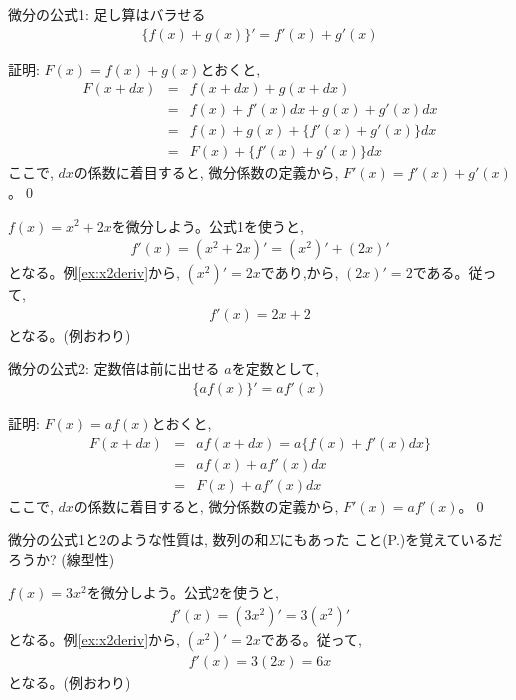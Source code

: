\begin{itembox}{微分の公式1: 足し算はバラせる}
\begin{eqnarray}
\{f(x)+g(x)\}'=f'(x)+g'(x)\label{eq:diff_form1}
\end{eqnarray}
\end{itembox}
証明: $F(x)=f(x)+g(x)$とおくと, 
\begin{eqnarray}
F(x+dx) & = & f(x+dx)+g(x+dx)\nonumber\\
               & = & f(x)+f'(x)dx+g(x)+g'(x)dx\nonumber\\
               & = & f(x)+g(x)+\{f'(x)+g'(x)\}dx\nonumber\\
               & = & F(x)+\{f'(x)+g'(x)\}dx
\end{eqnarray}
ここで, $dx$の係数に着目すると, 微分係数の定義から, $F'(x)=f'(x)+g'(x)$。\qed
\vv

\begin{exmpl}  $f(x)=x^2+2x$を微分しよう。公式1を使うと, 
\begin{eqnarray}
f'(x)=(x^2+2x)'=(x^2)'+(2x)'
\end{eqnarray}
となる。例\ref{ex:x2deriv}から, $(x^2)'=2x$であり,から, $(2x)'=2$である。従って, 
\begin{eqnarray}
f'(x)=2x+2
\end{eqnarray}
となる。(例おわり)\end{exmpl}
\hv

\begin{itembox}{微分の公式2: 定数倍は前に出せる}
$a$を定数として, 
\begin{eqnarray}
\{af(x)\}'=af'(x)\label{eq:diff_form2}
\end{eqnarray}
\end{itembox}
証明: $F(x)=af(x)$とおくと, 
\begin{eqnarray}
F(x+dx) & = & af(x+dx) = a\{f(x)+f'(x)dx\}\nonumber\\
               & = & af(x)+af'(x)dx\nonumber\\
               & = & F(x)+af'(x)dx
\end{eqnarray}
ここで, $dx$の係数に着目すると, 微分係数の定義から, $F'(x)=af'(x)$。\qed
\hv

微分の公式1と2のような性質は, 数列の和$\Sigma$にもあった
こと(P.\pageref{eq:sum_linear1})を覚えているだろうか? (線型性)\hv

\begin{exmpl}  $f(x)=3x^2$を微分しよう。公式2を使うと, 
\begin{eqnarray}
f'(x)=(3x^2)'=3(x^2)'
\end{eqnarray}
となる。例\ref{ex:x2deriv}から, $(x^2)'=2x$である。従って, 
\begin{eqnarray}
f'(x)=3(2x)=6x
\end{eqnarray}
となる。(例おわり)\end{exmpl}\

